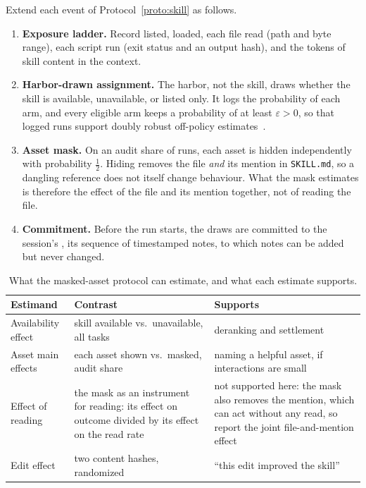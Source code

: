 \begin{protocol}\label{proto:stp-masked-asset}
Extend each event of Protocol~\ref{proto:skill} as follows.
\begin{enumerate}[leftmargin=1.5em,itemsep=1pt]
  \item \textbf{Exposure ladder.} Record listed, loaded, each file read
  (path and byte range), each script run (exit status and an output hash),
  and the tokens of skill content in the context.
  \item \textbf{Harbor-drawn assignment.} The harbor, not the skill, draws
  whether the skill is available, unavailable, or listed only. It logs the
  probability of each arm, and every eligible arm keeps a probability of at
  least $\varepsilon>0$, so that logged runs support doubly robust off-policy
  estimates~.
  \item \textbf{Asset mask.} On an audit share of runs, each asset is hidden
  independently with probability $\tfrac12$. Hiding removes the file
  \emph{and} its mention in \texttt{SKILL.md}, so a dangling reference does
  not itself change behaviour. What the mask estimates is therefore the effect
  of the file and its mention together, not of reading the file.
  \item \textbf{Commitment.} Before the run starts, the draws are committed
  to the session's , its sequence of timestamped notes,
  to which notes can be added but never changed.
\end{enumerate}
\end{protocol}

\begin{table}[H]
\centering\small
\caption{What the masked-asset protocol can estimate, and what each estimate supports.}
\label{tab:stp-skill-estimands}
\begin{tabularx}{\textwidth}{@{}l >{\raggedright\arraybackslash}X >{\raggedright\arraybackslash}X@{}}
\toprule
\textbf{Estimand} & \textbf{Contrast} & \textbf{Supports} \\
\midrule
Availability effect & skill available vs.\ unavailable, all tasks & deranking and settlement \\
Asset main effects & each asset shown vs.\ masked, audit share & naming a helpful asset, if interactions are small \\
Effect of reading & the mask as an instrument for reading: its effect on outcome divided by its effect on the read rate & not supported here: the mask also removes the mention, which can act without any read, so report the joint file-and-mention effect \\
Edit effect & two content hashes, randomized & ``this edit improved the skill'' \\
\bottomrule
\end{tabularx}
\end{table}


